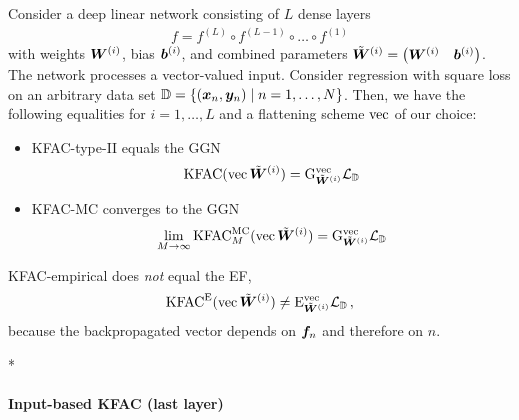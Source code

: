 \begin{test}
  Consider a deep linear network consisting of $L$ dense layers
  \begin{align*}
    f = f^{(L)} \circ f^{(L-1)} \circ \ldots \circ f^{(1)}
  \end{align*}
  with weights $\mW^{(i)}$, bias $\vb^{(i)}$, and combined parameters $\tilde{\mW}^{(i)} = \begin{pmatrix} \mW^{(i)} & \vb^{(i)} \end{pmatrix}$.
  The network processes a vector-valued input.
  Consider regression with square loss on an arbitrary data set $\sD = \{ (\vx_n, \vy_n) \mid n = 1, \dots, N \}$.
  Then, we have the following equalities for $i = 1, \dots, L$ and a flattening scheme $\vec$ of our choice:
  \begin{itemize}
  \item KFAC-type-II equals the GGN
    \begin{align*}
      \kfac(\vec \tilde{\mW}^{(i)}) = \ggn^{\vec}_{\tilde{\mW}^{(i)}} \gL_{\sD}
    \end{align*}
  \item KFAC-MC converges to the GGN
    \begin{align*}
      \lim_{M \to \infty} \kfac^{\text{MC}}_M(\vec \tilde{\mW}^{(i)}) = \ggn^{\vec}_{\tilde{\mW}^{(i)}} \gL_{\sD}
    \end{align*}

  \end{itemize}
  KFAC-empirical does \emph{not} equal the EF,
  \begin{align*}
    \kfac^{\text{E}}(\vec \tilde{\mW}^{(i)}) \neq \ef^{\vec}_{\tilde{\mW}^{(i)}} \gL_{\sD}\,,
  \end{align*}
  because the backpropagated vector depends on $\vf_n$ and therefore on $n$.
\end{test}

\switchcolumn[1]*
\switchcolumn[0]

\paragraph{Input-based KFAC (last layer)}~\cite{petersen2023isaac}

